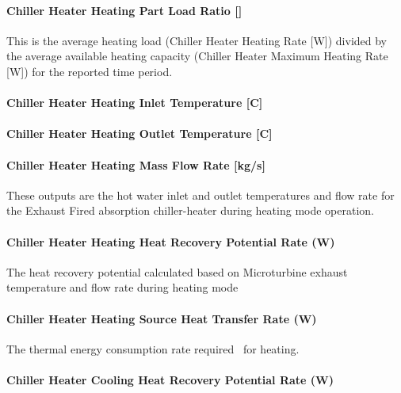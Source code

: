 \paragraph{Chiller Heater Heating Part Load Ratio {[]}}\label{chiller-heater-heating-part-load-ratio-1}

This is the average heating load (Chiller Heater Heating Rate {[}W{]}) divided by the average available heating capacity (Chiller Heater Maximum Heating Rate {[}W{]}) for the reported time period.

\paragraph{Chiller Heater Heating Inlet Temperature {[}C{]}}\label{chiller-heater-heating-inlet-temperature-c-1}

\paragraph{Chiller Heater Heating Outlet Temperature {[}C{]}}\label{chiller-heater-heating-outlet-temperature-c-1}

\paragraph{Chiller Heater Heating Mass Flow Rate {[}kg/s{]}}\label{chiller-heater-heating-mass-flow-rate-kgs-1}

These outputs are the hot water inlet and outlet temperatures and flow rate for the Exhaust Fired absorption chiller-heater during heating mode operation.

\paragraph{Chiller Heater Heating Heat Recovery Potential Rate (W)}\label{chiller-heater-heating-heat-recovery-potential-rate-w}

The heat recovery potential calculated based on Microturbine exhaust temperature and flow rate during heating mode

\paragraph{Chiller Heater Heating Source Heat Transfer Rate (W)}\label{chiller-heater-heating-source-heat-transfer-rate-w}

The thermal energy consumption rate required~ for heating.

\paragraph{Chiller Heater Cooling Heat Recovery Potential Rate (W)}\label{chiller-heater-cooling-heat-recovery-potential-rate-w}

